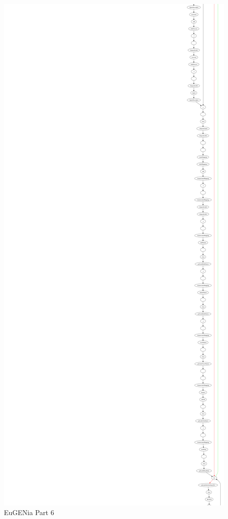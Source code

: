 \begin{minipage}[b]{\textwidth}
\centering
\includegraphics[height=0.97\textheight]{./figures/eug_6.png}
EuGENia Part 6
\end{minipage}
